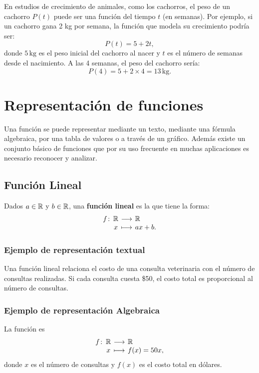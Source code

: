 \documentclass[a4,11pt]{aleph-notas}
\begin{document}
\begin{ejem}

    En estudios de crecimiento de animales, como los cachorros, el peso de un cachorro $P(t)$ puede ser una función del tiempo $t$ (en semanas). Por ejemplo, si un cachorro gana 2 kg por semana, la función que modela su crecimiento podría ser:
    \[
        P(t) = 5 + 2t,
    \]
    donde \( 5 \, \text{kg} \) es el peso inicial del cachorro al nacer y \( t \) es el número de semanas desde el nacimiento. A las 4 semanas, el peso del cachorro sería:
    \[
        P(4) = 5 + 2 \times 4 = 13 \, \text{kg}.
    \]
\end{ejem}

\section{Representación de funciones}

Una función se puede representar mediante un texto, mediante una fórmula algebraica, por una tabla de valores o a través de un gráfico. Además existe un conjunto básico de funciones que por su uso frecuente en muchas aplicaciones es necesario reconocer y analizar.

\subsection*{Función Lineal}

\begin{defi}
    Dados $a \in \mathbb{R}$ y $b\in\mathbb{R}$, una \textbf{función lineal} es la que tiene la forma:
    \[
        \funcion{f}{\R}{\R}{x}{ax+b.}
    \]
\end{defi}

\subsubsection*{Ejemplo de representación textual}

Una función lineal relaciona el costo de una consulta veterinaria con el número de consultas realizadas. Si cada consulta cuesta \$50, el costo total es proporcional al número de consultas.

\subsubsection*{Ejemplo de representación Algebraica}
La función es
\[
    \funcion{f}{\R}{\R}{x}{f(x) = 50x,}
\]
donde $x$ es el número de consultas y $f(x)$ es el costo total en dólares.
\end{document}
